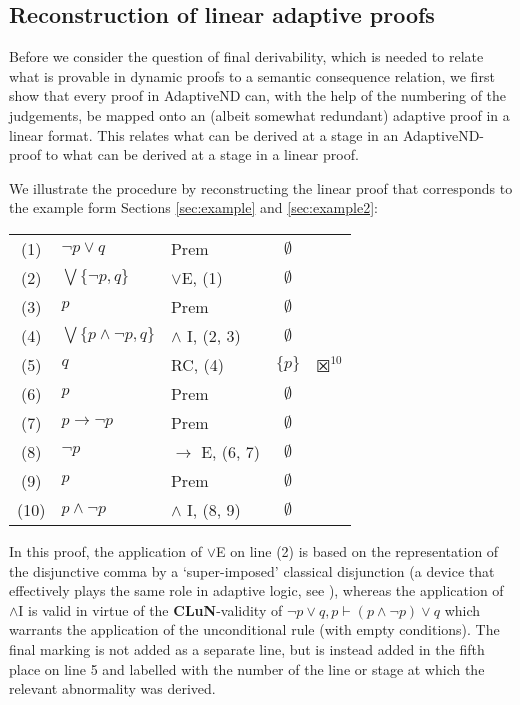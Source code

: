 \documentclass[]{article}
\begin{document}
\subsection{Reconstruction of linear adaptive proofs}
Before we consider the question of final derivability, which is needed to relate what is provable in dynamic proofs to a semantic consequence relation, we first show that every proof in \textsf{AdaptiveND} can, with the help of the numbering of the judgements, be mapped onto an (albeit somewhat redundant) adaptive proof in a linear format. This relates what can be derived at a stage in an \textsf{AdaptiveND}-proof to what can be derived at a stage in a linear proof.

We illustrate the procedure by reconstructing the linear proof that corresponds to the example form Sections \ref{sec:example} and \ref{sec:example2}:
\begin{center}
    \begin{tabular}{cllcl}
        (1) & $\neg p \vee q$ & Prem & $\emptyset$\\
        (2) & $\bigvee \{\neg p, q\}$ & $\vee$E, (1) & $\emptyset$\\
        (3) & $p$ & Prem & $\emptyset$\\
        (4) & $\bigvee \{p \wedge \neg p, q\}$ & $\wedge$ I, (2, 3) & $\emptyset$\\
        (5) & $q$ & RC, (4) & $\{p\}$ & $\XBox^{10}$\\
        (6) & $p$ & Prem & $\emptyset$\\
        (7) & $p \to \neg p$ & Prem & $\emptyset$\\
        (8) & $\neg p$ & $\to$ E, (6, 7) & $\emptyset$\\
        (9) & $p$ & Prem & $\emptyset$\\
        (10) & $p \wedge \neg p$ & $\wedge$ I, (8, 9) & $\emptyset$\\
    \end{tabular}
\end{center}
In this proof, the application of $\vee$E on line (2) is based on the representation of the disjunctive comma by a `super-imposed' classical disjunction (a device that effectively plays the same role in adaptive logic, see \cite[\S 2.2, 2.7]{Strasser:AdaptiveLogicsForDefeasibleReasoning:}), whereas the application of $\wedge$I is valid in virtue of the \textbf{CLuN}-validity of $\neg p \vee q, p \vdash (p \wedge \neg p) \vee q$ which warrants the application of the unconditional rule (with empty conditions). The final marking is not added as a separate line, but is instead added in the fifth place on line 5 and labelled with the number of the line or stage at which the relevant abnormality was derived.
\end{document}
